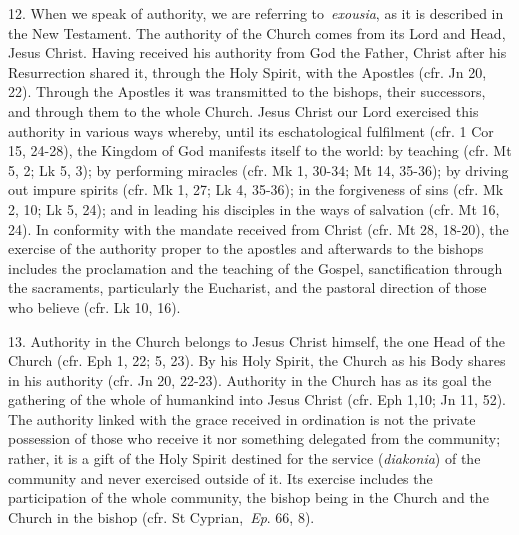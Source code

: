 12. When we speak of authority, we are referring to~\emph{exousia}, as
it is described in the New Testament. The authority of the Church comes
from its Lord and Head, Jesus Christ. Having received his authority from
God the Father, Christ after his Resurrection shared it, through the
Holy Spirit, with the Apostles (cfr. Jn 20, 22). Through the Apostles it
was transmitted to the bishops, their successors, and through them to
the whole Church. Jesus Christ our Lord exercised this authority in
various ways whereby, until its eschatological fulfilment (cfr. 1 Cor
15, 24-28), the Kingdom of God manifests itself to the world: by
teaching (cfr. Mt 5, 2; Lk 5, 3); by performing miracles (cfr. Mk 1,
30-34; Mt 14, 35-36); by driving out impure spirits (cfr. Mk 1, 27; Lk
4, 35-36); in the forgiveness of sins (cfr. Mk 2, 10; Lk 5, 24); and in
leading his disciples in the ways of salvation (cfr. Mt 16, 24). In
conformity with the mandate received from Christ (cfr. Mt 28, 18-20),
the exercise of the authority proper to the apostles and afterwards to
the bishops includes the proclamation and the teaching of the Gospel,
sanctification through the sacraments, particularly the Eucharist, and
the pastoral direction of those who believe (cfr. Lk 10, 16).

13. Authority in the Church belongs to Jesus Christ himself, the one
Head of the Church (cfr. Eph 1, 22; 5, 23). By his Holy Spirit, the
Church as his Body shares in his authority (cfr. Jn 20, 22-23).
Authority in the Church has as its goal the gathering of the whole of
humankind into Jesus Christ (cfr. Eph 1,10; Jn 11, 52). The authority
linked with the grace received in ordination is not the private
possession of those who receive it nor something delegated from the
community; rather, it is a gift of the Holy Spirit destined for the
service (\emph{diakonia}) of the community and never exercised outside
of it. Its exercise includes the participation of the whole community,
the bishop being in the Church and the Church in the bishop (cfr. St
Cyprian,~\emph{Ep}. 66, 8).

